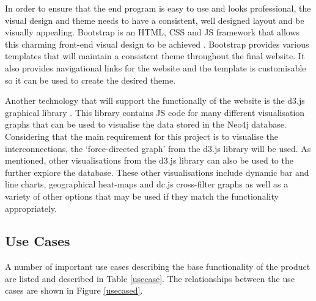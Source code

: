 \documentclass[12pt,onecolumn]{article}
\begin{document}
	In order to ensure that the end program is easy to use and looks professional, the visual design and theme needs to have a consistent, well designed layout and be visually appealing. Bootstrap is an HTML, CSS and JS framework that allows this charming front-end visual design to be achieved \cite{Bootstrap}. Bootstrap provides various templates that will maintain a consistent theme throughout the final website. It also provides navigational links for the website and the template is customisable so it can be used to create the desired theme.
	
	Another technology that will support the functionally of the website is the d3.js graphical library \cite{D3}. This library contains JS code for many different visualisation graphs that can be used to visualise the data stored in the Neo4j database. Considering that the main requirement for this project is to visualise the interconnections, the `force-directed graph' from the d3.js library will be used. As mentioned, other visualisations from the d3.js library can also be used to the further explore the database. These other visualisations include dynamic bar and line charts, geographical heat-maps and dc.js cross-filter graphs as well as a variety of other options that may be used if they match the functionality appropriately.
	
	\subsection{Use Cases}
	A number of important use cases describing the base functionality of the product are listed and described in Table \ref{usecase}. The relationships between the use cases are shown in Figure \ref{usecased}.
	
\end{document}
